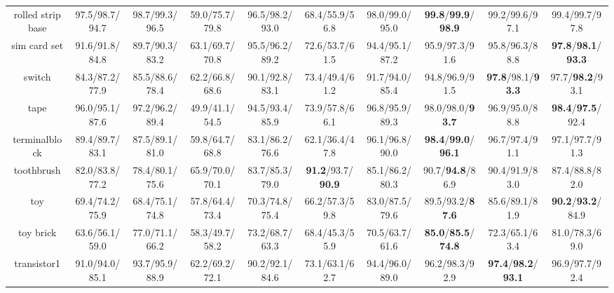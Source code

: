 \documentclass{article}
\theoremstyle{plain}
\theoremstyle{definition}
\theoremstyle{remark}
\begin{document}
\begin{table}[p]
{\begin{tabular}{ccccccccc>{\columncolor{oursblue}}c}
rolled strip base & 97.5/98.7/94.7 & 98.7/99.3/96.5 & 59.0/75.7/79.8 & 96.5/98.2/93.0 & 68.4/55.9/56.8 & 98.0/99.0/95.0 & \textbf{99.8}/\textbf{99.9}/\textbf{98.9} & 99.2/99.6/97.1 & 99.4/99.7/97.8 \\
\cellcolor{rowgray} sim card set & \cellcolor{rowgray} 91.6/91.8/84.8 & \cellcolor{rowgray} 89.7/90.3/83.2 & \cellcolor{rowgray} 63.1/69.7/70.8 & \cellcolor{rowgray} 95.5/96.2/89.2 & \cellcolor{rowgray} 72.6/53.7/61.5 & \cellcolor{rowgray} 94.4/95.1/87.2 & 95.9/97.3/91.6 & 95.8/96.3/88.8 & \textbf{97.8}/\textbf{98.1}/\textbf{93.3} \\
switch           & 84.3/87.2/77.9 & 85.5/88.6/78.4 & 62.2/66.8/68.6 & 90.1/92.8/83.1 & 73.4/49.4/61.2 & 91.7/94.0/85.4 & 94.8/96.9/91.5 & \textbf{97.8}/98.1/\textbf{93.3} & 97.7/\textbf{98.2}/93.1 \\
\cellcolor{rowgray} tape & \cellcolor{rowgray} 96.0/95.1/87.6 & \cellcolor{rowgray} 97.2/96.2/89.4 & \cellcolor{rowgray} 49.9/41.1/54.5 & \cellcolor{rowgray} 94.5/93.4/85.9 & \cellcolor{rowgray} 73.9/57.8/66.1 & \cellcolor{rowgray} 96.8/95.9/89.3 & 98.0/98.0/\textbf{93.7} & 96.9/95.0/88.8 & \textbf{98.4}/\textbf{97.5}/92.4 \\
terminalblock    & 89.4/89.7/83.1 & 87.5/89.1/81.0 & 59.8/64.7/68.8 & 83.1/86.2/76.6 & 62.1/36.4/47.8 & 96.1/96.8/90.0 & \textbf{98.4}/\textbf{99.0}/\textbf{96.1} & 96.7/97.4/91.1 & 97.1/97.7/91.3 \\
\cellcolor{rowgray} toothbrush & \cellcolor{rowgray} 82.0/83.8/77.2 & \cellcolor{rowgray} 78.4/80.1/75.6 & \cellcolor{rowgray} 65.9/70.0/70.1 & \cellcolor{rowgray} 83.7/85.3/79.0 & \cellcolor{rowgray} \textbf{91.2}/93.7/\textbf{90.9} & \cellcolor{rowgray} 85.1/86.2/80.3 & 90.7/\textbf{94.8}/86.9 & 90.4/91.9/83.0 & 87.4/88.8/82.0 \\
toy              & 69.4/74.2/75.9 & 68.4/75.1/74.8 & 57.8/64.4/73.4 & 70.3/74.8/75.4 & 66.2/57.3/59.8 & 83.0/87.5/79.6 & 89.5/93.2/\textbf{87.6} & 85.6/89.1/81.9 & \textbf{90.2}/\textbf{93.2}/84.9 \\
\cellcolor{rowgray} toy brick & \cellcolor{rowgray} 63.6/56.1/59.0 & \cellcolor{rowgray} 77.0/71.1/66.2 & \cellcolor{rowgray} 58.3/49.7/58.2 & \cellcolor{rowgray} 73.2/68.7/63.3 & \cellcolor{rowgray} 68.4/45.3/55.9 & \cellcolor{rowgray} 70.5/63.7/61.6 & \cellcolor{rowgray} \textbf{85.0}/\textbf{85.5}/\textbf{74.8} & \cellcolor{rowgray} 72.3/65.1/63.4 & 81.0/78.3/69.0 \\
transistor1      & 91.0/94.0/85.1 & 93.7/95.9/88.9 & 62.2/69.2/72.1 & 90.2/92.1/84.6 & 73.1/63.1/62.7 & 94.4/96.0/89.0 & 96.2/98.3/92.9 & \textbf{97.4}/\textbf{98.2}/\textbf{93.1} & 96.9/97.7/92.4 \\

\end{tabular}}
\end{table}
\end{document}
